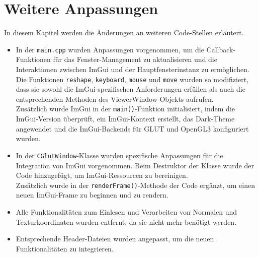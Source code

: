 \chapter{Weitere Anpassungen}

In diesem Kapitel werden die Änderungen an weiteren Code-Stellen erläutert.
\\
\begin{itemize}
    \item 
    In der \lstinline{main.cpp} wurden Anpassungen vorgenommen, um die
    Callback-Funktionen für das Fenster-Management zu aktualisieren und die
    Interaktionen zwischen ImGui und der Hauptfensterinstanz zu ermöglichen. Die
    Funktionen \lstinline{reshape}, \lstinline{keyboard}, \lstinline{mouse} und
    \lstinline{move} wurden so modifiziert, dass sie sowohl die
    ImGui-spezifischen Anforderungen erfüllen als auch die entsprechenden
    Methoden des ViewerWindow-Objekts aufrufen. 
    \\
    Zusätzlich wurde ImGui in der
    \lstinline{main()}-Funktion initialisiert, indem die ImGui-Version
    überprüft, ein ImGui-Kontext erstellt, das Dark-Theme angewendet und die
    ImGui-Backends für GLUT und OpenGL3 konfiguriert wurden.
    \\
    \item 
    In der \lstinline{CGlutWindow}-Klasse wurden spezifische Anpassungen für die Integration
    von ImGui vorgenommen. Beim Destruktor der Klasse wurde der Code hinzugefügt, um ImGui-Ressourcen zu
    bereinigen.
    \\
    Zusätzlich wurde in der \lstinline{renderFrame()}-Methode der Code ergänzt, um einen
    neuen ImGui-Frame zu beginnen und zu rendern. 
    \\
    \item 
    Alle Funktionalitäten zum Einlesen und Verarbeiten von Normalen und
    Texturkoordinaten wurden entfernt, da sie nicht mehr benötigt werden.
    \\
    \item 
    Entsprechende Header-Dateien wurden angepasst, um die neuen Funktionalitäten zu integrieren.
\end{itemize}